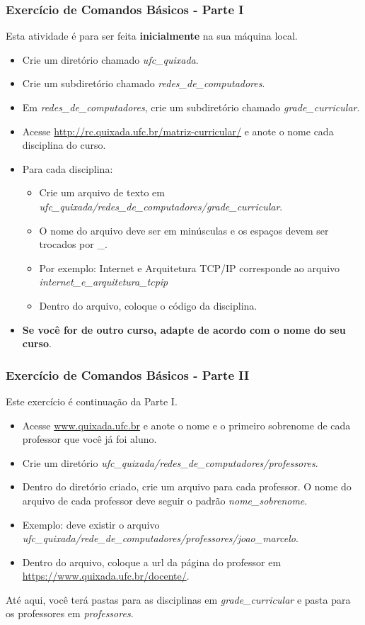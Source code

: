 \documentclass{beamer}
\begin{document}
   \begin{frame}
      \frametitle{Exercício de Comandos Básicos - Parte I}
      Esta atividade é para ser feita \textbf{inicialmente} na sua máquina local.
      \begin{itemize}
         \item Crie um diretório chamado \textit{ufc\_quixada}.
	      \item Crie um subdiretório chamado \textit{redes\_de\_computadores}.
	      \item Em \textit{redes\_de\_computadores}, crie um subdiretório chamado \textit{grade\_curricular}.
         \item Acesse \url{http://rc.quixada.ufc.br/matriz-curricular/} e anote o nome cada disciplina do curso.
         \item Para cada disciplina:
	      \begin{itemize}
	         \item Crie um arquivo de texto em \textit{ufc\_quixada/redes\_de\_computadores/grade\_curricular}.
	         \item O nome do arquivo deve ser em minúsculas e os espaços devem ser trocados por \_.
	         \item Por exemplo: Internet e Arquitetura TCP/IP corresponde ao arquivo \textit{internet\_e\_arquitetura\_tcpip}
	         \item Dentro do arquivo, coloque o código da disciplina. 
         \end{itemize}
         \item \textbf{Se você for de outro curso, adapte de acordo com o nome do seu curso}.
      \end{itemize}
   \end{frame}

   \begin{frame}
      \frametitle{Exercício de Comandos Básicos - Parte II}
      Este exercício é continuação da Parte I.
      \begin{itemize}
         \item Acesse \url{www.quixada.ufc.br} e anote o nome e o primeiro sobrenome de cada professor que você já foi aluno.
         \item Crie um diretório \textit{ufc\_quixada/redes\_de\_computadores/professores}.
         \item Dentro do diretório criado, crie um arquivo para cada professor. O nome do arquivo de cada professor deve seguir o padrão \textit{nome\_sobrenome}. 
         \item Exemplo: deve existir o arquivo \textit{ufc\_quixada/rede\_de\_computadores/professores/joao\_marcelo}.
         \item Dentro do arquivo, coloque a url da página do professor em \url{https://www.quixada.ufc.br/docente/}.
      \end{itemize}
      Até aqui, você terá pastas para as disciplinas em \textit{grade\_curricular} e pasta para os professores em \textit{professores}.
   \end{frame}
\end{document}
